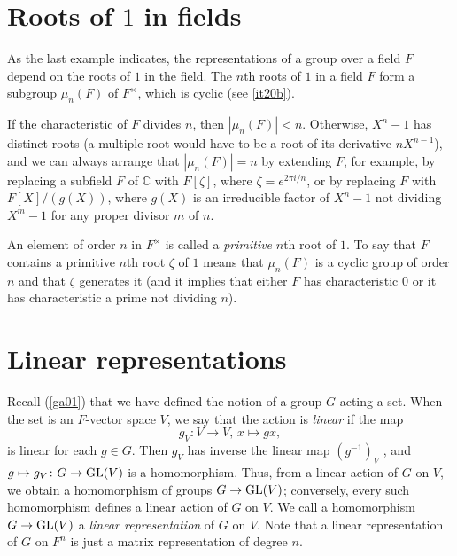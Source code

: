 \documentclass[a4paper,11pt,final,openany]{memoir}%
\theoremstyle{nonumberplain}
\begin{document}
\section{Roots of \texorpdfstring{$1$}{1} in fields}

As the last example indicates, the representations of a group over a field $F$
depend on the roots of $1$ in the field. The $n$th roots of $1$ in a field $F$
form a subgroup $\mu_{n}(F)$ of $F^{\times}$, which is cyclic (see \ref{it20b}).

If the characteristic of $F$ divides $n$, then $|\mu_{n}(F)|<n$. Otherwise,
$X^{n}-1$ has distinct roots (a multiple root would have to be a root of its
derivative $nX^{n-1}$), and we can always arrange that $|\mu_{n}(F)|=n$ by
extending $F$, for example, by replacing a subfield $F$ of $\mathbb{C}{}$ with
$F[\zeta]$, where $\zeta=e^{2\pi i/n}$, or by replacing $F$ with
$F[X]/(g(X))$, where $g(X)$ is an irreducible factor of $X^{n}-1$ not dividing
$X^{m}-1$ for any proper divisor $m$ of $n.$

An element of order $n$ in $F^{\times}$ is called a \emph{primitive} $n$th
root of $1$. To say that $F$ contains a primitive $n$th root $\zeta$ of $1$
means that $\mu_{n}(F)$ is a cyclic group of order $n$ and that $\zeta$
generates it (and it implies that either $F$ has characteristic $0$ or it has
characteristic a prime not dividing $n$).

\section{Linear representations}

Recall (\ref{ga01}) that we have defined the notion of a group $G$ acting a
set. When the set is an $F$-vector space $V$, we say that the action is
\emph{linear}
%
if the map
\[
g_{V}\colon V\rightarrow V\text{, }x\mapsto gx,
\]
is linear for each $g\in G$. Then $g_{V}$ has inverse the linear map
$(g^{-1})_{V}$ , and $g\mapsto g_{V}\colon G\rightarrow\operatorname{GL}(V)$ is a
homomorphism. Thus, from a linear action of $G$ on $V$, we obtain a
homomorphism of groups $G\rightarrow\operatorname{GL}(V)$; conversely, every such
homomorphism defines a linear action of $G$ on $V$. We call a homomorphism
$G\rightarrow\operatorname{GL}(V)$ a \emph{linear representation}%
of $G$ on $V$. Note that a linear representation of $G$ on $F^{n}$ is just a
matrix representation of degree $n$.
\end{document}
